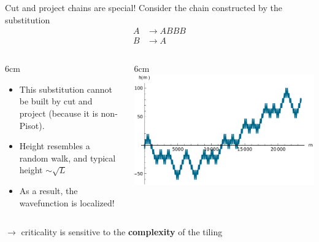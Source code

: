 \documentclass[xcolor=x11names,compress,professionalfonts]{beamer}
\renewcommand{\(}{\begin{columns}}
\renewcommand{\)}{\end{columns}}
\newcommand{\<}[1]{\begin{column}{#1}}
\renewcommand{\>}{\end{column}}
\begin{document}
\begin{frame}{Cut and project chains are special!}
Consider the chain constructed by the substitution
\begin{align*}
	A & \to ABBB \\
	B & \to A
\end{align*}
\begin{columns}
\<{6cm}
\begin{itemize}
	\item This substitution cannot be built by cut and project (because it is non-Pisot).
	\item Height resembles a random walk, and typical height $\sim \sqrt{L}$
	\item As a result, the wavefunction is localized! 
\end{itemize}
\>
\<{6cm}
\includegraphics[scale=.5]{img/heightsB3.pdf}
\>
\end{columns}
$\rightarrow$ criticality is sensitive to the \textbf{complexity} of the tiling
\end{frame}
\end{document}
